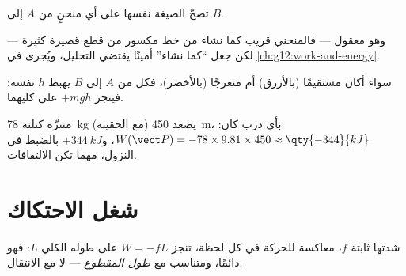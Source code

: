 \begin{proposition}[أي مسار]\label{prop:g11:work-of-force:anypath}
تصحّ الصيغة نفسها على أي  منحنٍ من $A$ إلى $B$.
\end{proposition}
\admitted

\begin{remark}\label{rem:g11:work-of-force:anypath}
وهو معقول --- فالمنحني قريب كما نشاء من خط مكسور من قطع
قصيرة كثيرة --- لكن جعل ``كما نشاء'' أمينًا يقتضي
التحليل، ويُجرى في \cref{ch:g12:work-and-energy}.
\end{remark}

\begin{omfigure}

{\small سواء أكان مستقيمًا (بالأزرق) أم متعرجًا (بالأخضر)، فكل  من $A$
إلى $B$ يهبط $h$ نفسه: فينجز  $+mgh$ على كليهما.}
\end{omfigure}

\begin{example}[متنزّه]\label{ex:g11:work-of-force:hiker}
متنزّه كتلته \qty{78}{kg} (مع الحقيبة) يصعد \qty{450}{m}، بأي
درب كان: $W(\vect P) = -78 \times 9.81 \times 450 \approx \qty{-344}{kJ}$،
و$+\qty{344}{kJ}$ بالضبط في النزول، مهما تكن الالتفافات.
\end{example}

\section{شغل الاحتكاك}

\begin{proposition}\label{prop:g11:work-of-force:friction}
  شدتها ثابتة $f$، معاكسة للحركة في كل لحظة،
تنجز  $W = -fL$ على  طوله الكلي $L$:
فهو  دائمًا، ومتناسب مع \emph{طول 
المقطوع} --- لا مع الانتقال.
\end{proposition}

